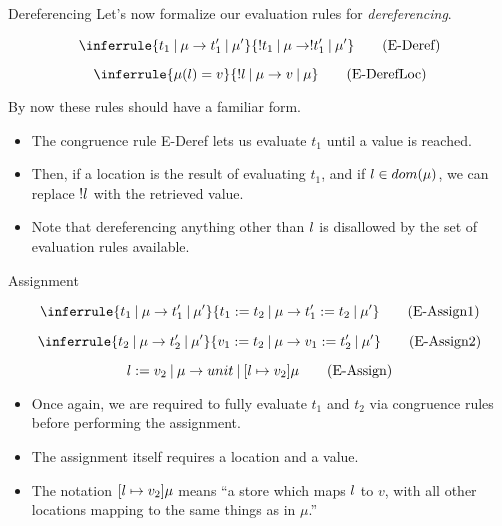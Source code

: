 \documentclass[11pt]{beamer}
\begin{document}
\begin{frame}[fragile=singleslide]{Dereferencing }
Let's now formalize our evaluation rules for \emph{dereferencing}.

\begin{equation}
\inferrule{t_1\:|\:\mu \rightarrow t_1'\:|\:\mu'}{!t_1\:|\:\mu \rightarrow !t_1'\:|\:\mu'} \tag{E-Deref}
\end{equation}

\begin{equation}
\inferrule{\mu(\mathnormal{l}) = v}{!\mathnormal{l}\:|\:\mu \rightarrow v\:|\:\mu} \tag{E-DerefLoc}
\end{equation}

By now these rules should have a familiar form.
\begin{itemize}
\item The congruence rule E-Deref lets us evaluate $t_1$ until a value is reached.  
\item Then, if a location is the result of evaluating $t_1$, and if $\mathnormal{l} \in dom(\mu)$, we can replace $!\mathnormal{l}$ with the retrieved value.  
\item Note that dereferencing anything other than $\mathnormal{l}$ is disallowed by the set of evaluation rules available.
\end{itemize}

\end{frame}


\begin{frame}[fragile=singleslide]{Assignment}

\begin{equation}
\inferrule{t_1\:|\:\mu \rightarrow t_1'\:|\:\mu'}{t_1 := t_2\:|\:\mu \rightarrow t_1' := t_2\:|\:\mu'} \tag{E-Assign1}
\end{equation}

\begin{equation}
\inferrule{t_2\:|\:\mu \rightarrow t_2'\:|\:\mu'}{v_1 := t_2\:|\:\mu \rightarrow v_1 := t_2'\:|\:\mu'} \tag{E-Assign2}
\end{equation}

\begin{equation}
l := v_2\:|\:\mu \rightarrow unit\:|\:[\mathnormal{l} \mapsto v_2]\mu \tag{E-Assign}
\end{equation}
\vspace{-0.5em}
\begin{itemize}
\item Once again, we are required to fully evaluate $t_1$ and $t_2$ via congruence rules before performing the assignment.
\item The assignment itself requires a location and a value.
\item The notation $[\mathnormal{l} \mapsto v_2]\mu$ means ``a store which maps $\mathnormal{l}$ to $v$, with all other locations mapping to the same things as in $\mu$.''
\end{itemize}
\end{frame}
\end{document}
